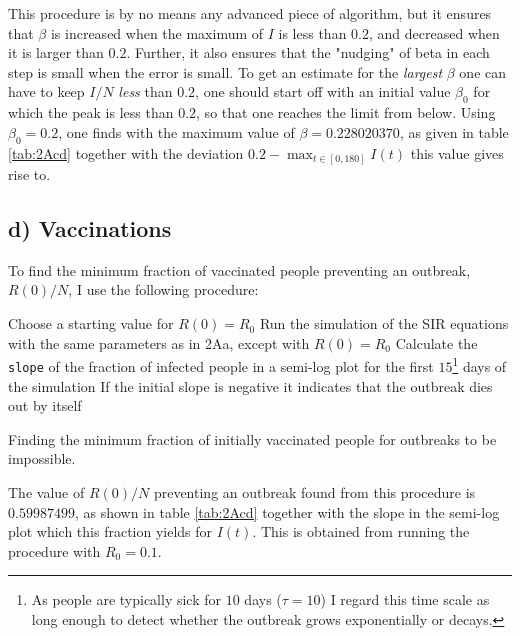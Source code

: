 This procedure is by no means any advanced piece of algorithm, but it ensures that $\beta$ is increased when the maximum of $I$ is less than $0.2$, and decreased when it is larger than $0.2$. Further, it also ensures that the "nudging" of beta in each step is small when the error is small. To get an estimate for the \textit{largest} $\beta$ one can have to keep $I/N$ \textit{less} than $0.2$, one should start off with an initial value $\beta_0$ for which the peak is less than $0.2$, so that one reaches the limit from below. Using $\beta_0 = 0.2$, one finds with the maximum value of $\beta = 0.228020370$, as given in table \ref{tab:2Acd} together with the deviation $0.2 - \max_{t\in[0,180]} I(t)$ this value gives rise to.  



\subsection{d) Vaccinations}

To find the minimum fraction of vaccinated people preventing an outbreak, $R(0)/N$, I use the following procedure:

\begin{algorithm}[H]
	Choose a starting value for $R(0) = R_0$\;
	Run the simulation of the SIR equations with the same parameters as in 2Aa, except with $R(0) = R_0$ \;
	Calculate the \texttt{slope} of the fraction of infected people in a semi-log plot for the first $15$\footnote{As people are typically sick for $10$ days ($\tau = 10$) I regard this time scale as long enough to detect whether the outbreak grows exponentially or decays.} days of the simulation\;
	If the initial slope is negative it indicates that the outbreak dies out by itself\;
	\caption{Finding the minimum fraction of initially vaccinated people for outbreaks to be impossible.}
\end{algorithm} 

The value of $R(0)/N$ preventing an outbreak found from this procedure is $0.59987499$, as shown in table \ref{tab:2Acd} together with the slope in the semi-log plot which this fraction yields for $I(t)$. This is obtained from running the procedure with $R_0 = 0.1$.

